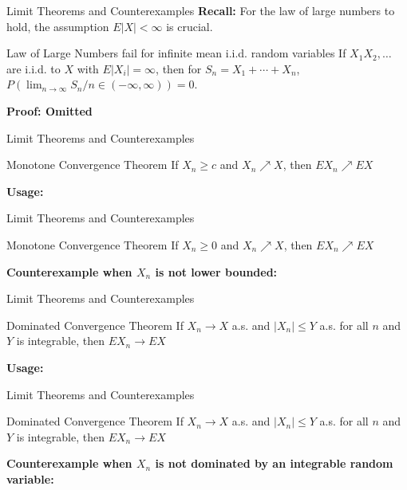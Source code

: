 \documentclass [aspectratio=169]{beamer}
\begin{document}
\begin{frame}{Limit Theorems and Counterexamples}
    \textbf{Recall:} For the law of large numbers to hold, the assumption $E|X|<\infty$ is crucial. \\ 
    \begin{block}{Law of Large Numbers fail for infinite mean i.i.d. random variables}
    If $X_1 X_2, \dots$ are i.i.d. to $X$ with $E|X_i| = \infty$, then for $S_n = X_1 + \cdots + X_n$, $P(\lim_{n\to \infty}S_n/n \in (-\infty, \infty))=0$.
    \end{block}
    \textbf{Proof: Omitted}
    \vspace{1.8in}
\end{frame}

\begin{frame}{Limit Theorems and Counterexamples}
    \begin{block}{Monotone Convergence Theorem}
    If $X_n \geq c$ and $X_n \nearrow X$, then $EX_n \nearrow EX$ 
    \end{block}
    \textbf{Usage: }
    \vspace{1.8in}
\end{frame}

\begin{frame}{Limit Theorems and Counterexamples}
    \begin{block}{Monotone Convergence Theorem}
    If $X_n \geq 0$ and $X_n \nearrow X$, then $EX_n \nearrow EX$ 
    \end{block}
    \textbf{Counterexample when $X_n$ is not lower bounded: }
    \vspace{1.8in}
\end{frame}

\begin{frame}{Limit Theorems and Counterexamples}
    \begin{block}{Dominated Convergence Theorem}
    If $X_n \to X$ a.s. and $|X_n| \leq Y$ a.s. for all $n$ and $Y$ is integrable, then $EX_n \to EX$ 
    \end{block}
    \textbf{Usage: }
    \vspace{1.8in}
\end{frame}

\begin{frame}{Limit Theorems and Counterexamples}
    \begin{block}{Dominated Convergence Theorem}
    If $X_n \to X$ a.s. and $|X_n| \leq Y$ a.s. for all $n$ and $Y$ is integrable, then $EX_n \to EX$ 
    \end{block}
    \textbf{Counterexample when $X_n$ is not dominated by an integrable random variable: }
    \vspace{1.8in}
\end{frame}
\end{document}
